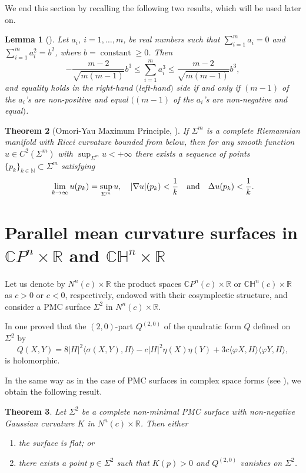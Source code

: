 \documentclass[11pt]{amsart}
\theoremstyle{plain}
\newtheorem{theorem}                {Theorem}      [section]
\newtheorem{lemma}        [theorem]  {Lemma}
\theoremstyle{definition}
\DeclareMathOperator{\cst}{constant}
\numberwithin{equation}{section}
\begin{document}
We end this section by recalling the following two results, which will be used later on.

\begin{lemma}[\cite{AdC,O}]\label{l:oku} Let $a_i$, $i=1,\ldots,m$, be real numbers such that $\sum_{i=1}^ma_i=0$ and $\sum_{i=1}^ma_i^2=b^2$, where $b=\cst\geq 0$. Then
$$
-\frac{m-2}{\sqrt{m(m-1)}}b^3\leq\sum_{i=1}^ma_i^3\leq\frac{m-2}{\sqrt{m(m-1)}}b^3,
$$
and equality holds in the right-hand $($left-hand$)$ side if and only if $(m-1)$ of the $a_i$'s are non-positive and equal $($$(m-1)$ of the $a_i$'s are non-negative and equal$)$.
\end{lemma}

\begin{theorem}[Omori-Yau Maximum Principle, \cite{Y}]\label{OY} If $\Sigma^m$ is a complete Riemannian
manifold with Ricci curvature bounded from below, then for any
smooth function $u\in C^2(\Sigma^m)$ with $\sup_{\Sigma^m}
u<+\infty$ there exists a sequence of points
$\{p_k\}_{k\in\mathbb{N}}\subset \Sigma^m$ satisfying
$$
\lim_{k\rightarrow\infty}u(p_k)=\sup_{\Sigma^m}u,\quad |\nabla u|(p_k)<\frac{1}{k}\quad\textnormal{and}\quad\Delta u(p_k)<\frac{1}{k}.
$$
\end{theorem}

\section{Parallel mean curvature surfaces in $\mathbb{C}P^n\times\mathbb{R}$ and $\mathbb{CH}^n\times\mathbb{R}$}

Let us denote by $N^n(c)\times\mathbb{R}$ the product spaces $\mathbb{C}P^n(c)\times\mathbb{R}$ or $\mathbb{CH}^n(c)\times\mathbb{R}$ as $c>0$ or $c<0$, respectively, endowed with their cosymplectic structure, and consider a PMC surface $\Sigma^2$ in $N^n(c)\times\mathbb{R}$.

In \cite[Theorem 3.2]{FR-TAMS} one proved that the $(2,0)$-part $Q^{(2,0)}$ of the quadratic form $Q$ defined on $\Sigma^2$ by
\begin{equation}\label{eq:Q}
Q(X,Y)=8|H|^2\langle\sigma(X,Y),H\rangle-c|H|^2\eta(X)\eta(Y)+3c\langle \varphi X,
H\rangle\langle \varphi Y, H\rangle,
\end{equation}
is holomorphic.

In the same way as in the case of PMC surfaces in complex space forms (see \cite{FP}), we obtain the following result.

\begin{theorem}\label{thm} Let $\Sigma^2$ be a complete non-minimal PMC surface with
non-negative Gaussian curvature $K$ in $N^n(c)\times\mathbb{R}$. Then either
\begin{enumerate}
\item the surface is flat; or

\item there exists a point $p\in\Sigma^2$ such that $K(p)>0$ and $Q^{(2,0)}$ vanishes on $\Sigma^2$.
\end{enumerate}
\end{theorem}
\end{document}

